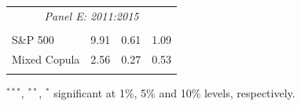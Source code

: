 \documentclass[pdf,9pt,xcolor=dvipsnames,hide notes]{beamer}
\newcommand{\backupend}{
	\setcounter{framenumber}{\value{finalframe}}
}
\begin{document}
\begin{frame}
\begin{threeparttable}[H]
\begin{tabularx}{\textwidth}{@{\extracolsep{\fill}}llll@{}}
	\multicolumn{4}{c}{\textit{Panel E: 2011:2015}} \\
	&       &       &       \\
	S\&P 500 & 9.91  & 0.61  & 1.09 \\
	Mixed Copula & 2.56  & 0.27  & 0.53 \\
	\multicolumn{1}{r}{} & \multicolumn{1}{r}{} & \multicolumn{1}{r}{} & \multicolumn{1}{r}{} \\
	\bottomrule
\end{tabularx}%
\begin{tablenotes}
	\item \scriptsize $^{\ast\ast\ast}$, $^{\ast\ast}$, $^{\ast}$  significant at 1\%, 5\% and 10\% levels, respectively.
\end{tablenotes}
\label{tab:table111}%
\end{threeparttable}%

\end{frame}

\backupend
\end{document}
